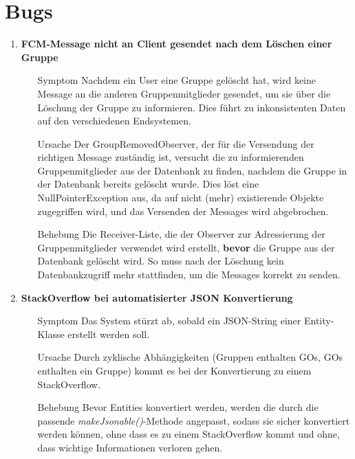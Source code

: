 \documentclass[11pt,a4paper]{scrartcl}
\def\threedigits#1{%
  \ifnum#1<100 0\fi
  \ifnum#1<10 0\fi
  \number#1}
\begin{document}
\newpage

\section{Bugs}

\begin{enumerate}[label={\textbf{/B\protect\threedigits{\theenumi}0/}}, leftmargin=*]
\item \textbf{FCM-Message nicht an Client gesendet nach dem Löschen einer Gruppe}
	\begin{itemize}
		\item[Symptom]
		Nachdem ein User eine Gruppe gelöscht hat, wird keine Message an die anderen Gruppenmitglieder gesendet, um sie über die Löschung der Gruppe zu informieren. Dies führt zu inkonsistenten Daten auf den verschiedenen Endsystemen.
		\item[Ursache]
		Der GroupRemovedObserver, der für die Versendung der richtigen Message zuständig ist, versucht die zu informierenden Gruppenmitglieder aus der Datenbank zu finden, nachdem die Gruppe in der Datenbank bereits gelöscht wurde. Dies löst eine NullPointerException aus, da auf nicht (mehr) existierende Objekte zugegriffen wird, und das Versenden der Messages wird abgebrochen.
		\item[Behebung]
		Die Receiver-Liste, die der Observer zur Adressierung der Gruppenmitglieder verwendet wird erstellt, \textbf{bevor} die Gruppe aus der Datenbank gelöscht wird. So muss nach der Löschung kein Datenbankzugriff mehr stattfinden, um die Messages korrekt zu senden.
	\end{itemize}

\item \textbf{StackOverflow bei automatisierter JSON Konvertierung}
	\begin{itemize}
		\item[Symptom]
		Das System stürzt ab, sobald ein JSON-String einer Entity-Klasse erstellt werden soll.
		\item[Ursache]
		Durch zyklische Abhängigkeiten (Gruppen enthalten GOs, GOs enthalten ein Gruppe) kommt es bei der Konvertierung zu einem StackOverflow.
		\item[Behebung]
		Bevor Entities konvertiert werden, werden die durch die passende \textit{makeJsonable()}-Methode angepasst, sodass sie sicher konvertiert werden können, ohne dass es zu einem StackOverflow kommt und ohne, dass wichtige Informationen verloren gehen.
	\end{itemize}


\end{enumerate}
\end{document}
